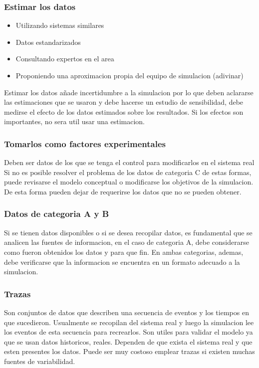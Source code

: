 \documentclass[a4paper]{article}
\begin{document}
\subsubsection*{Estimar los datos}
\begin{itemize}
    \item Utilizando sistemas similares
    \item Datos estandarizados
    \item Consultando expertos en el area 
    \item Proponiendo una aproximacion propia del equipo de simulacion (adivinar)
\end{itemize}
Estimar los datos añade incertidumbre a la simulacion por lo que deben aclararse
las estimaciones que se usaron y debe hacerse un estudio de sensibilidad, debe 
medirse el efecto de los datos estimados sobre los resultados. Si los efectos son
importantes, no sera util usar una estimacion.

\subsubsection*{Tomarlos como factores experimentales}
Deben ser datos de los que se tenga el control para modificarlos en el
sistema real
Si no es posible resolver el problema de los datos de categoria C de estas formas,
puede revisarse el modelo conceptual o modificarse los objetivos de la simulacion.
De esta forma pueden dejar de requerirse los datos que no se pueden obtener.

\subsubsection*{Datos de categoria A y B}
Si se tienen datos disponibles o si se desea recopilar datos, es fundamental que
se analicen las fuentes de informacion, en el caso de categoria A, debe considerarse
como fueron obtenidos los datos y para que fin. En ambas categorias, ademas, debe
verificarse que la informacion se encuentra en un formato adecuado a la simulacion.

\subsubsection*{Trazas}
Son conjuntos de datos que describen una secuencia de eventos y los tiempos en que 
sucedieron. Usualmente se recopilan del sistema real y luego la simulacion lee 
los eventos de esta secuencia para recrearlos. Son utiles para validar el modelo 
ya que se usan datos historicos, reales.
Dependen de que exista el sistema real y que esten presentes los datos. Puede ser muy
costoso emplear trazas si existen muchas fuentes de variabilidad.
\end{document}
